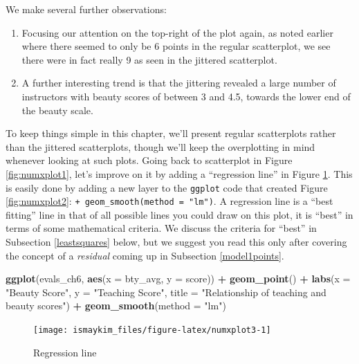 \documentclass[12pt, krantz2,]{krantz}
\makeatletter
\newenvironment{Shaded}{\begin{snugshade}}{\end{snugshade}}
\newcommand{\DataTypeTok}[1]{\textcolor[rgb]{0.27,0.27,0.27}{#1}}
\newcommand{\KeywordTok}[1]{\textcolor[rgb]{0.27,0.27,0.27}{\textbf{#1}}}
\newcommand{\NormalTok}[1]{#1}
\newcommand{\OperatorTok}[1]{\textcolor[rgb]{0.43,0.43,0.43}{\textbf{#1}}}
\newcommand{\StringTok}[1]{\textcolor[rgb]{0.5,0.5,0.5}{#1}}
\providecommand{\tightlist}{%
  \setlength{\itemsep}{0pt}\setlength{\parskip}{0pt}}
\newenvironment{kframe}{%
\medskip{}
\setlength{\fboxsep}{.8em}
 \def\at@end@of@kframe{}%
 \ifinner\ifhmode%
  \def\at@end@of@kframe{\end{minipage}}%
  \begin{minipage}{\columnwidth}%
 \fi\fi%
 \def\FrameCommand##1{\hskip\@totalleftmargin \hskip-\fboxsep
 \colorbox{shadecolor}{##1}\hskip-\fboxsep
     \hskip-\linewidth \hskip-\@totalleftmargin \hskip\columnwidth}%
 \MakeFramed {\advance\hsize-\width
   \@totalleftmargin\z@ \linewidth\hsize
   \@setminipage}}%
 {\par\unskip\endMakeFramed%
 \at@end@of@kframe}
\renewenvironment{Shaded}{\begin{kframe}}{\end{kframe}}
\makeatother
\begin{document}
We make several further observations:

\begin{enumerate}
\def\labelenumi{\arabic{enumi}.}
\tightlist
\item
  Focusing our attention on the top-right of the plot again, as noted earlier where there seemed to only be 6 points in the regular scatterplot, we see there were in fact really 9 as seen in the jittered scatterplot.
\item
  A further interesting trend is that the jittering revealed a large number of instructors with beauty scores of between 3 and 4.5, towards the lower end of the beauty scale.
\end{enumerate}

To keep things simple in this chapter, we'll present regular scatterplots rather than the jittered scatterplots, though we'll keep the overplotting in mind whenever looking at such plots. Going back to scatterplot in Figure \ref{fig:numxplot1}, let's improve on it by adding a ``regression line'' in Figure \ref{fig:numxplot3}. This is easily done by adding a new layer to the \texttt{ggplot} code that created Figure \ref{fig:numxplot2}: \texttt{+\ geom\_smooth(method\ =\ "lm")}. A regression line is a ``best fitting'' line in that of all possible lines you could draw on this plot, it is ``best'' in terms of some mathematical criteria. We discuss the criteria for ``best'' in Subsection \ref{leastsquares} below, but we suggest you read this only after covering the concept of a \emph{residual} coming up in Subsection \ref{model1points}.

\begin{Shaded}
\begin{Highlighting}[]
\KeywordTok{ggplot}\NormalTok{(evals_ch6, }\KeywordTok{aes}\NormalTok{(}\DataTypeTok{x =}\NormalTok{ bty_avg, }\DataTypeTok{y =}\NormalTok{ score)) }\OperatorTok{+}
\StringTok{  }\KeywordTok{geom_point}\NormalTok{() }\OperatorTok{+}
\StringTok{  }\KeywordTok{labs}\NormalTok{(}\DataTypeTok{x =} \StringTok{"Beauty Score"}\NormalTok{, }\DataTypeTok{y =} \StringTok{"Teaching Score"}\NormalTok{, }
       \DataTypeTok{title =} \StringTok{"Relationship of teaching and beauty scores"}\NormalTok{) }\OperatorTok{+}\StringTok{  }
\StringTok{  }\KeywordTok{geom_smooth}\NormalTok{(}\DataTypeTok{method =} \StringTok{"lm"}\NormalTok{)}
\end{Highlighting}
\end{Shaded}

\begin{figure}

{\centering \texttt{[image: ismaykim\_files/figure-latex/numxplot3-1]} 

}

\caption{Regression line}\label{fig:numxplot3}
\end{figure}
\end{document}
